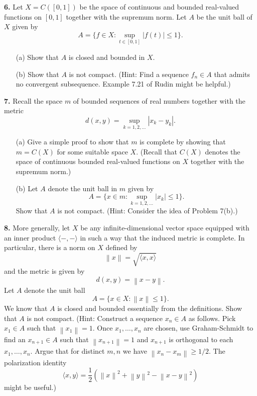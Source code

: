 \documentclass[12pt]{article}
\newcommand{\norm}[1]{\left\lVert#1\right\rVert}
\begin{document}
\medskip

\noindent \textbf{6.} Let $X = C([0,1])$ be the space of continuous and bounded real-valued functions on $[0,1]$ together with the supremum norm. Let $A$ be the unit ball of $X$ given by 
\[
A = \{f \in X : \sup_{t \in [0,1]} |f(t)| \leqslant 1\}.
\]
\begin{enumerate}
\item[(a)] Show that $A$ is closed and bounded in $X$. 
\item[(b)] Show that $A$ is not compact. (Hint: Find a sequence $f_n \in A$ that admits no convergent subsequence. Example 7.21 of Rudin might be helpful.)
\end{enumerate}

\medskip

\noindent \textbf{7.} Recall the space $m$ of bounded sequences of real numbers together with the metric 
\[
d(x,y) = \sup_{k=1, 2, \ldots} |x_k - y_k|.
\]
\begin{enumerate}
\item[(a)] Give a simple proof to show that $m$ is complete by showing that $m = C(X)$ for some suitable space $X$. (Recall that $C(X)$ denotes the space of continuous bounded real-valued functions on $X$ together with the supremum norm.) 
\item[(b)] Let $A$ denote the unit ball in $m$ given by 
\[
A = \{x \in m : \sup_{k=1, 2, \ldots} |x_k| \leqslant 1\}.
\]
Show that $A$ is not compact. (Hint: Consider the idea of Problem 7(b).)
\end{enumerate}

\medskip

\noindent \textbf{8.} More generally, let $X$ be any infinite-dimensional vector space equipped with an inner product $\langle -, - \rangle$ in such a way that the induced metric is complete. In particular, there is a norm on $X$ defined by 
\[
\norm{x} = \sqrt{\langle x, x \rangle}
\]
and the metric is given by 
\[
d(x,y) = \norm{x - y}.
\] 
Let $A$ denote the unit ball 
\[
A = \{x \in X : \norm{x} \leqslant 1\}.
\]
We know that $A$ is closed and bounded essentially from the definitions. Show that $A$ is not compact. (Hint: Construct a sequence $x_n \in A$ as follows. Pick $x_1 \in A$ such that $\norm{x_1} = 1$. Once $x_1, \ldots, x_n$ are chosen, use Graham-Schmidt to find an $x_{n+1} \in A$ such that $\norm{x_{n+1}} = 1$ and $x_{n+1}$ is orthogonal to each $x_1, \ldots, x_n$. Argue that for distinct $m, n$ we have $\norm{x_n - x_m} \geqslant 1/2$. The polarization identity 
\[
\langle x, y \rangle = \frac{1}{2} (\norm{x}^2 + \norm{y}^2 - \norm{x-y}^2)
\]
might be useful.)
\end{document}
